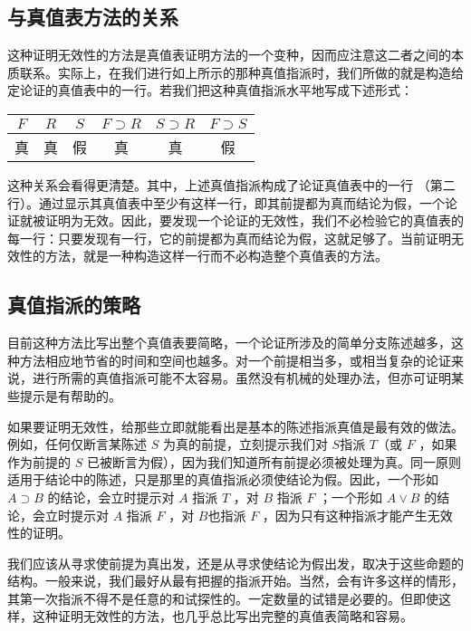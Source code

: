\subsection{与真值表方法的关系}

这种证明无效性的方法是真值表证明方法的一个变种，因而应注意这二者之间的本质联系。实际上，在我们进行如上所示的那种真值指派时，我们所做的就是构造给定论证的真值表中的一行。若我们把这种真值指派水平地写成下述形式：

\begin{center}
\begin{tabular}{|cccccc|}
\hline
$F$ & $R$ & $S$ & $F \supset R$ & $S \supset R$ & $F \supset S$ \\
\hline
真 & 真 & 假 & 真 & 真 & 假 \\
\hline
\end{tabular}
\end{center}

这种关系会看得更清楚。其中，上述真值指派构成了论证真值表中的一行 （第二行）。通过显示其真值表中至少有这样一行，即其前提都为真而结论为假，一个论证就被证明为无效。因此，要发现一个论证的无效性，我们不必检验它的真值表的每一行：只要发现有一行，它的前提都为真而结论为假，这就足够了。当前证明无效性的方法，就是一种构造这样一行而不必构造整个真值表的方法。\cite{jeffrey1967}

\subsection{真值指派的策略}

目前这种方法比写出整个真值表要简略，一个论证所涉及的简单分支陈述越多，这种方法相应地节省的时间和空间也越多。对一个前提相当多，或相当复杂的论证来说，进行所需的真值指派可能不太容易。虽然没有机械的处理办法，但亦可证明某些提示是有帮助的。

如果要证明无效性，给那些立即就能看出是基本的陈述指派真值是最有效的做法。例如，任何仅断言某陈述 $S$ 为真的前提，立刻提示我们对 $S$指派 $T$（或 $F$ ，如果作为前提的 $S$ 已被断言为假），因为我们知道所有前提必须被处理为真。同一原则适用于结论中的陈述，只是那里的真值指派必须使结论为假。因此，一个形如 $A \supset B$ 的结论，会立时提示对 $A$ 指派 $T$ ，对 $B$ 指派 $F$ ；一个形如 $A \vee B$ 的结论，会立时提示对 $A$ 指派 $F$ ，对 $B$也指派 $F$ ，因为只有这种指派才能产生无效性的证明。

我们应该从寻求使前提为真出发，还是从寻求使结论为假出发，取决于这些命题的结构。一般来说，我们最好从最有把握的指派开始。当然，会有许多这样的情形，其第一次指派不得不是任意的和试探性的。一定数量的试错是必要的。但即使这样，这种证明无效性的方法，也几乎总比写出完整的真值表简略和容易。 

